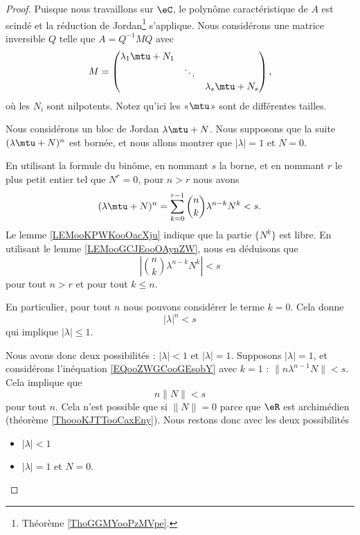\begin{proof}
	Puisque nous travaillons sur \( \eC\), le polynôme caractéristique de \( A\) est scindé et la réduction de Jordan\footnote{Théorème \ref{ThoGGMYooPzMVpe}.} s'applique. Nous considérons une matrice inversible \( Q\) telle que \( A=Q^{-1} MQ\) avec
	\begin{equation}
		M=\begin{pmatrix}
			\lambda_1\mtu+N_1 &        &                   \\
			                  & \ddots &                   \\
			                  &        & \lambda_s\mtu+N_s
		\end{pmatrix},
	\end{equation}
	où les \( N_i\) sont nilpotents. Notez qu'ici les «\( \mtu\)» sont de différentes tailles.

	\begin{subproof}
		Nous considérons un bloc de Jordan \( \lambda\mtu+N\). Nous supposons que la suite \( (\lambda\mtu+N)^n\) est bornée, et nous allons montrer que \( | \lambda |=1\) et \( N=0\).

		En utilisant la formule du binôme, en nommant \( s\) la borne, et en nommant \( r\) le plus petit entier tel que \( N^r=0\), pour \( n>r\) nous avons
		\begin{equation}
			(\lambda\mtu+N)^n=\sum_{k=0}^{r-1}\binom{ n }{ k }\lambda^{n-k}N^k<s.
		\end{equation}
		Le lemme \ref{LEMooKPWKooOacXju} indique que la partie \( \{ N^k \}\) est libre. En utilisant le lemme \ref{LEMooGCJEooOAynZW}, nous en déduisons que
		\begin{equation}    \label{EQooZWGCooGEsobY}
			\left| \binom{ n }{ k }\lambda^{n-k}N^k \right|<s
		\end{equation}
		pour tout \( n>r\) et pour tout \( k\leq n\).

		En particulier, pour tout \( n\) nous pouvons considérer le terme \( k=0\). Cela donne
		\begin{equation}
			| \lambda |^n<s
		\end{equation}
		qui implique \( | \lambda |\leq 1\).

		Nous avons donc deux possibilités : \( | \lambda |<1\) et \( | \lambda |=1\). Supposons \( | \lambda |=1\), et considérons l'inéquation \eqref{EQooZWGCooGEsobY} avec \( k=1\) : \( \| n\lambda^{n-1}N \|<s\). Cela implique que
		\begin{equation}
			n\| N \|<s
		\end{equation}
		pour tout \( n\). Cela n'est possible que si \( \| N \|=0\) parce que \( \eR\) est archimédien (théorème \ref{ThoooKJTTooCaxEny}). Nous restons donc avec les deux possibilités
		\begin{itemize}
			\item \( | \lambda |<1\)
			\item \( | \lambda |=1\) et \( N=0\).
		\end{itemize}


\end{subproof}
\end{proof}

